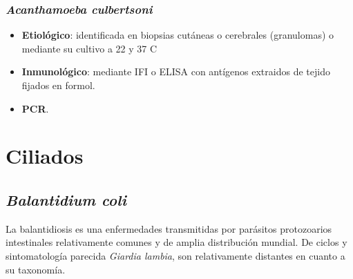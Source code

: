 \subsubsection{\textit{Acanthamoeba culbertsoni}}
\begin{itemize}[itemsep=0pt,parsep=0pt,topsep=0pt,partopsep=0pt]
	\item\textbf{Etiológico}: identificada en biopsias cutáneas o cerebrales (granulomas) o mediante su cultivo a 22 y 37 C
	\item\textbf{Inmunológico}: mediante IFI o ELISA con antígenos extraidos de tejido fijados en formol.
	\item\textbf{PCR}.
\end{itemize}
\newpage
\section{Ciliados}
\subsection{\textit{Balantidium coli}}
La balantidiosis es una enfermedades transmitidas por parásitos protozoarios intestinales relativamente comunes y de amplia distribución mundial. De ciclos y sintomatología parecida \textit{Giardia lambia}, son relativamente distantes en cuanto a su taxonomía.

